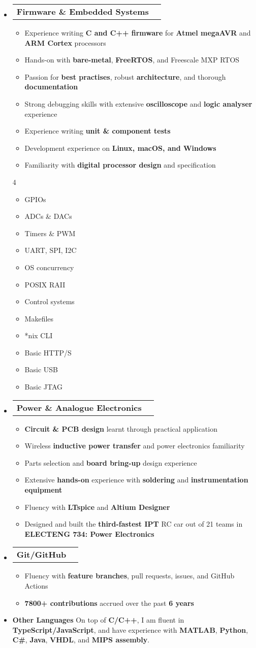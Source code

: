 \documentclass[11pt,a4paper]{article}[leftmargin=*]
\makeatletter
\def \entryspacing {-0pt}
\def \bulletstylei {\faAngleRight\hspace{-4.5pt}}
\newcommand{\resumeEntryStart}{\begin{itemize}[leftmargin=2.5mm]}
\newcommand{\resumeEntryEnd}{\end{itemize}\vspace{\entryspacing}}
\newcommand{\resumeItemListStart}{\begin{itemize}[leftmargin=4.5mm]}
\newcommand{\resumeItemListEnd}{\end{itemize}}
\newcommand{\resumeItemListStartColumns}[2][-0.5]{\vspace*{#1\multicolsep}
\begin{multicols}{#2}\begin{itemize}[leftmargin=4.5mm]}
\newcommand{\resumeItemListEndColumns}[1][-1]{\end{itemize}\end{multicols}\vspace*{#1\multicolsep}}
\newcommand{\resumeItem}[2][\bulletstylei]{
  \item[\small#1]\small{
    {#2 \vspace{-2pt}}
  }
}
\newcommand{\resumeEntryTD}[2]{
  \vspace{-1pt}\item[]
    \begin{tabularx}{0.97\textwidth}{X@{\hspace{60pt}}r}
      \textbf{\color{primary}#1} & {\firabook\color{accent}\small#2} \\
    \end{tabularx}\vspace{-6pt}
}
\newcommand{\resumeEntryS}[2]{
  \item[]\small{
    \textbf{\color{primary}#1 }{ #2 \vspace{-4pt}}
  }
}
\newcommand{\resumeBf}[1]{\small\textbf{\color{halfbold}#1}}
\makeatother
\begin{document}
\resumeEntryStart
\resumeEntryTD
{Firmware \& Embedded Systems}{}
\resumeItemListStart
\resumeItem {Experience writing \resumeBf{C and C++ firmware} for \resumeBf{Atmel megaAVR} and \resumeBf{ARM Cortex} processors}
\resumeItem {Hands-on with \resumeBf{bare-metal}, \resumeBf{FreeRTOS}, and Freescale MXP RTOS}
\resumeItem {Passion for \resumeBf{best practises}, robust \resumeBf{architecture}, and thorough \resumeBf{documentation}}
\resumeItem {Strong debugging skills with extensive \resumeBf{oscilloscope} and \resumeBf{logic analyser} experience}
\resumeItem {Experience writing \resumeBf{unit \& component tests}}
\resumeItem {Development experience on \resumeBf{Linux, macOS, and Windows}}
\resumeItem {Familiarity with \resumeBf{digital processor design} and specification}
\resumeItemListEnd
\resumeItemListStartColumns[-0.5]{4}
\resumeItem {GPIOs}
\resumeItem {ADCs \& DACs}
\resumeItem {Timers \& PWM}
\resumeItem {UART, SPI, I2C}
\resumeItem {OS concurrency}
\resumeItem {POSIX RAII}
\resumeItem {Control systems}
\resumeItem {Makefiles}
\resumeItem {*nix CLI}
\resumeItem {Basic HTTP/S}
\resumeItem {Basic USB}
\resumeItem {Basic JTAG}
\resumeItemListEndColumns
\resumeEntryEnd

\resumeEntryStart
\resumeEntryTD
{Power \& Analogue Electronics}{}
\resumeItemListStart
\resumeItem {\resumeBf{Circuit \& PCB design} learnt through practical application}
\resumeItem {Wireless \resumeBf{inductive power transfer} and power electronics familiarity}
\resumeItem {Parts selection and \resumeBf{board bring-up} design experience}
\resumeItem {Extensive \resumeBf{hands-on} experience with \resumeBf{soldering} and \resumeBf{instrumentation equipment}}
\resumeItem {Fluency with \resumeBf{LTspice} and \resumeBf{Altium Designer}}
\resumeItem {Designed and built the \resumeBf{third-fastest IPT} RC car out of 21 teams in \resumeBf{ELECTENG 734: Power Electronics}}
\resumeItemListEnd
\resumeEntryEnd

\resumeEntryStart
\resumeEntryTD
{Git/GitHub}{}
\resumeItemListStart
\resumeItem {Fluency with \resumeBf{feature branches}, pull requests, issues, and GitHub Actions}
\resumeItem {\resumeBf{7800+ contributions} accrued over the past \resumeBf{6 years}}
\resumeItemListEnd
\resumeEntryEnd

\resumeEntryStart
\resumeEntryS
{Other Languages}{On top of \resumeBf{C/C++}, I am fluent in \resumeBf{TypeScript/JavaScript}, and have experience with \resumeBf{MATLAB}, \resumeBf{Python}, \resumeBf{C\#}, \resumeBf{Java}, \resumeBf{VHDL}, and \resumeBf{MIPS assembly}.}
\resumeEntryEnd
\end{document}

